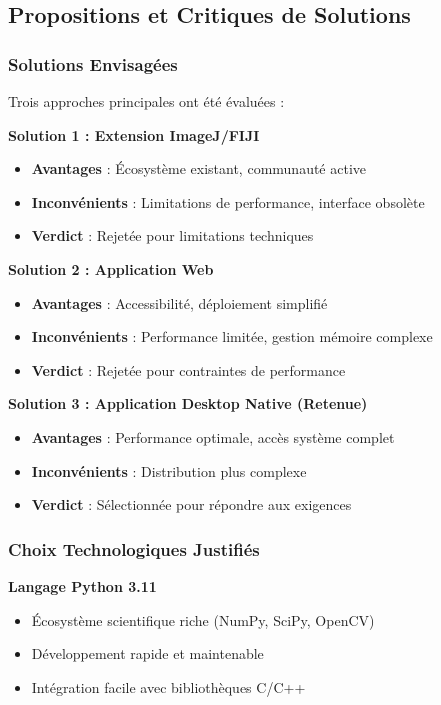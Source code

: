 \documentclass[12pt,a4paper]{article}
\begin{document}
\subsection{Propositions et Critiques de Solutions}

\subsubsection{Solutions Envisagées}

Trois approches principales ont été évaluées :

\textbf{Solution 1 : Extension ImageJ/FIJI}
\begin{itemize}
\item \textbf{Avantages} : Écosystème existant, communauté active
\item \textbf{Inconvénients} : Limitations de performance, interface obsolète
\item \textbf{Verdict} : Rejetée pour limitations techniques
\end{itemize}

\textbf{Solution 2 : Application Web}
\begin{itemize}
\item \textbf{Avantages} : Accessibilité, déploiement simplifié
\item \textbf{Inconvénients} : Performance limitée, gestion mémoire complexe
\item \textbf{Verdict} : Rejetée pour contraintes de performance
\end{itemize}

\textbf{Solution 3 : Application Desktop Native (Retenue)}
\begin{itemize}
\item \textbf{Avantages} : Performance optimale, accès système complet
\item \textbf{Inconvénients} : Distribution plus complexe
\item \textbf{Verdict} : Sélectionnée pour répondre aux exigences
\end{itemize}

\subsubsection{Choix Technologiques Justifiés}

\textbf{Langage Python 3.11}
\begin{itemize}
\item Écosystème scientifique riche (NumPy, SciPy, OpenCV)
\item Développement rapide et maintenable
\item Intégration facile avec bibliothèques C/C++
\end{itemize}
\end{document}
